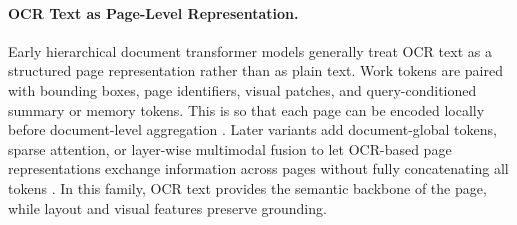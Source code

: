 \documentclass[11pt]{article}
\begin{document}

\paragraph{OCR Text as Page-Level Representation.} 
Early hierarchical document transformer models generally treat OCR text as a structured page representation rather than as plain text. Work tokens are paired with bounding boxes, page identifiers, visual patches, and query-conditioned summary or memory tokens. This is so that each page can be encoded locally before document-level aggregation \cite{tito2023hierarchical, dong2024multi}. Later variants add document-global tokens, sparse attention, or layer-wise multimodal fusion to let OCR-based page representations exchange information across pages without fully concatenating all tokens \cite{blau2024gram, borchmann2025arctic}. In this family, OCR text provides the semantic backbone of the page, while layout and visual features preserve grounding.
\end{document}
